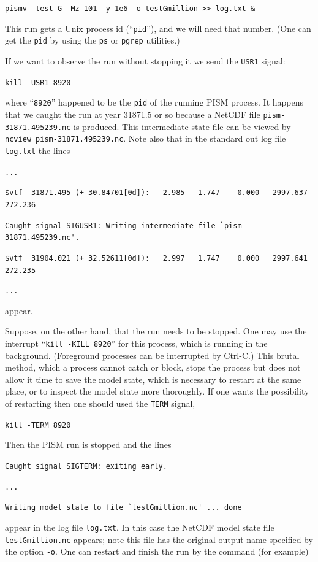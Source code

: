 \documentclass[11pt,final]{amsart}
\begin{document}
\verb|pismv -test G -Mz 101 -y 1e6 -o testGmillion >> log.txt &|

\noindent This run gets a Unix process id (``\verb|pid|''), and we will need that number.  (One can get the \verb|pid| by using the \verb|ps| or \verb|pgrep| utilities.)

If we want to observe the run without stopping it we send the \verb|USR1| signal:

\verb|kill -USR1 8920|

\noindent where ``\verb|8920|'' happened to be the \verb|pid| of the running PISM process.  It happens that we caught the run at year 31871.5 or so because a NetCDF file \verb|pism-31871.495239.nc| is produced.  This intermediate state file can be viewed by \verb|ncview pism-31871.495239.nc|.  Note also that in the standard out log file \verb|log.txt| the lines

\verb|...|

\verb|$vtf  31871.495 (+ 30.84701[0d]):   2.985   1.747    0.000   2997.637   272.236|

\verb|Caught signal SIGUSR1: Writing intermediate file `pism-31871.495239.nc'.|

\verb|$vtf  31904.021 (+ 32.52611[0d]):   2.997   1.747    0.000   2997.641   272.235|

\verb|...|

\noindent appear.

Suppose, on the other hand, that the run needs to be stopped.  One may use the interrupt ``\verb|kill -KILL 8920|'' for this process, which is running in the background.  (Foreground processes can be interrupted by Ctrl-C.)  This brutal method, which a process cannot catch or block, stops the process but does not allow it  time to save the model state, which is necessary to restart at the same place, or to inspect the model state more thoroughly.  If one wants the possibility of restarting then one should used the \verb|TERM| signal, 

\verb|kill -TERM 8920|

\noindent Then the PISM run is stopped and the lines

\verb|Caught signal SIGTERM: exiting early.|

\verb|...|

\verb|Writing model state to file `testGmillion.nc' ... done|

\noindent appear in the log file \verb|log.txt|.  In this case the NetCDF model state file \verb|testGmillion.nc| appears; note this file has the original output name specified by the option \verb|-o|.  One can restart and finish the run by the command (for example)
\end{document}
